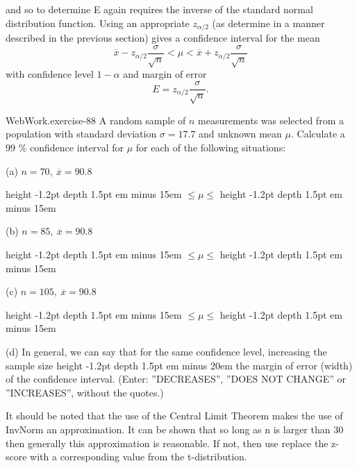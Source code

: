 \documentclass[10pt,]{book}
\newcommand{\fillin}[1]{\leavevmode\leaders\vrule height -1.2pt depth 1.5pt \hskip #1em minus #1em \null}
\numberwithin{equation}{section}
\newcommand{\lt}{<}
\begin{document}
and so to determine E again requires the inverse of the standard normal distribution function.  Using an appropriate \(z_{\alpha /2}\) (as determine in a manner described in the previous section) gives a confidence interval for the mean%
\begin{equation*}
\overline{x} - z_{\alpha / 2} \frac{\sigma}{\sqrt{n}} \lt \mu \lt \overline{x} + z_{\alpha / 2} \frac{\sigma}{\sqrt{n}}
\end{equation*}
with confidence level \(1-\alpha\) and margin of error%
\begin{equation*}
E = z_{\alpha /2} \frac{\sigma}{\sqrt{n}}.
\end{equation*}
%
\par
\hypertarget{p-1308}{}%
\begin{inlineexercise}{WebWork.}{exercise-88}%
\hypertarget{p-1309}{}%
A random sample of \(n\) measurements was selected from a population with standard deviation \(\sigma = 17.7\) and unknown mean \(\mu\). Calculate a \(99\) \% confidence interval for \(\mu\) for each of the following situations:%
\par
\hypertarget{p-1310}{}%
(a) \(n = 70, \ \overline{x} = 90.8\)%
\par
\hypertarget{p-1311}{}%
 \fillin{15} \(\leq \mu \leq\)  \fillin{15}%
\par
\hypertarget{p-1312}{}%
(b)  \(n = 85, \ \overline{x} = 90.8\)%
\par
\hypertarget{p-1313}{}%
 \fillin{15} \(\leq \mu \leq\)  \fillin{15}%
\par
\hypertarget{p-1314}{}%
(c)  \(n = 105, \ \overline{x} = 90.8\)%
\par
\hypertarget{p-1315}{}%
 \fillin{15} \(\leq \mu \leq\)  \fillin{15}%
\par
\hypertarget{p-1316}{}%
(d)  In general, we can say that for the same confidence level, increasing the sample size  \fillin{20} the margin of error (width) of the confidence interval.  (Enter: ''DECREASES'', ''DOES NOT CHANGE'' or ''INCREASES'', without the quotes.)%
\end{inlineexercise}
%
\par
\hypertarget{p-1317}{}%
It should be noted that the use of the Central Limit Theorem makes the use of  InvNorm an approximation. It can be shown that so long as n is larger than 30 then generally this approximation is reasonable. If not, then use replace the z-score with a corresponding value from the t-distribution.%
\par
\hypertarget{p-1318}{}%
\end{document}
